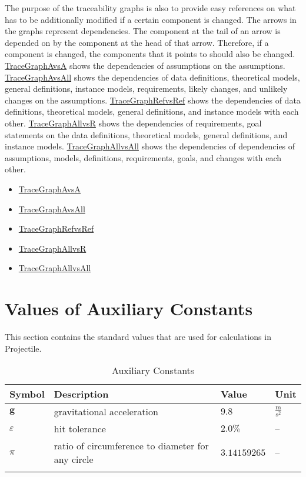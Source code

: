 \documentclass[12pt]{article}
\begin{document}
The purpose of the traceability graphs is also to provide easy references on what has to be additionally modified if a certain component is changed. The arrows in the graphs represent dependencies. The component at the tail of an arrow is depended on by the component at the head of that arrow. Therefore, if a component is changed, the components that it points to should also be changed. \hyperref{../../../traceygraphs/Projectile/avsa.pdf}{}{}{TraceGraphAvsA} shows the dependencies of assumptions on the assumptions. \hyperref{../../../traceygraphs/Projectile/avsall.pdf}{}{}{TraceGraphAvsAll} shows the dependencies of data definitions, theoretical models, general definitions, instance models, requirements, likely changes, and unlikely changes on the assumptions. \hyperref{../../../traceygraphs/Projectile/refvsref.pdf}{}{}{TraceGraphRefvsRef} shows the dependencies of data definitions, theoretical models, general definitions, and instance models with each other. \hyperref{../../../traceygraphs/Projectile/allvsr.pdf}{}{}{TraceGraphAllvsR} shows the dependencies of requirements, goal statements on the data definitions, theoretical models, general definitions, and instance models. \hyperref{../../../traceygraphs/Projectile/allvsall.pdf}{}{}{TraceGraphAllvsAll} shows the dependencies of dependencies of assumptions, models, definitions, requirements, goals, and changes with each other.

\begin{itemize}
\item{\hyperref{../../../traceygraphs/Projectile/avsa.pdf}{}{}{TraceGraphAvsA}}
\item{\hyperref{../../../traceygraphs/Projectile/avsall.pdf}{}{}{TraceGraphAvsAll}}
\item{\hyperref{../../../traceygraphs/Projectile/refvsref.pdf}{}{}{TraceGraphRefvsRef}}
\item{\hyperref{../../../traceygraphs/Projectile/allvsr.pdf}{}{}{TraceGraphAllvsR}}
\item{\hyperref{../../../traceygraphs/Projectile/allvsall.pdf}{}{}{TraceGraphAllvsAll}}
\end{itemize}
\section{Values of Auxiliary Constants}
\label{Sec:AuxConstants}
This section contains the standard values that are used for calculations in Projectile.

\begin{longtable}{l l l l}
\toprule
\textbf{Symbol} & \textbf{Description} & \textbf{Value} & \textbf{Unit}
\\
\midrule
\endhead
$\mathbf{g}$ & gravitational acceleration & $9.8$ & $\frac{\text{m}}{\text{s}^{2}}$
\\
$ε$ & hit tolerance & $2.0\%$ & --
\\
$π$ & ratio of circumference to diameter for any circle & $3.14159265$ & --
\\
\bottomrule
\caption{Auxiliary Constants}
\label{Table:TAuxConsts}
\end{longtable}
\end{document}

